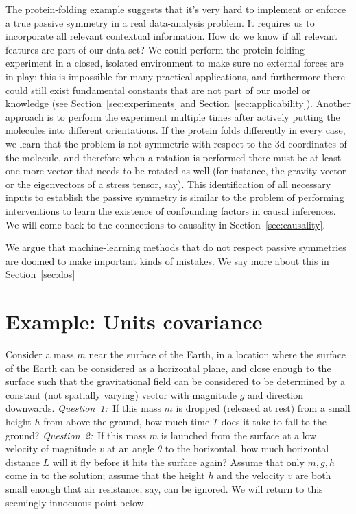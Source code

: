 \documentclass{article}
\theoremstyle{plain}
\theoremstyle{definition}
\theoremstyle{remark}
\newcommand{\sectionname}{Section}
\newcommand{\secref}[1]{\sectionname~\ref{#1}}
\begin{document}
The protein-folding example suggests that it's very hard to implement or enforce a true passive symmetry in a real data-analysis problem.
It requires us to incorporate all relevant contextual information.
How do we know if all relevant features are part of our data set?
We could perform the protein-folding experiment in a closed, isolated environment to make sure no external forces are in play;
this is impossible for many practical applications, and furthermore there could still exist fundamental constants that are not part of our model or knowledge (see \secref{sec:experiments} and \secref{sec:applicability}).
Another approach is to perform the experiment multiple times after actively putting the molecules into different orientations.
If the protein folds differently in every case, we learn that the problem is not symmetric with respect to the 3d coordinates of the molecule, and therefore when a rotation is performed there must be at least one more vector that needs to be rotated as well (for instance, the gravity vector or the eigenvectors of a stress tensor, say).
This identification of all necessary inputs to establish the passive symmetry is similar to the problem of performing interventions to learn the existence of confounding factors in causal inferences.
We will come back to the connections to causality in \secref{sec:causality}.

We argue that machine-learning methods that do not respect passive symmetries are doomed to make important kinds of mistakes.
We say more about this in \secref{sec:dos}

\section{Example: Units covariance}\label{sec:units}

Consider a mass $m$ near the surface of the Earth, in a location where the surface of the Earth can be considered as a horizontal plane, and close enough to the surface such that the gravitational field can be considered to be determined by a constant (not spatially varying) vector with magnitude $g$ and direction downwards.
\textsl{Question~1:}~If this mass $m$ is dropped (released at rest) from a small height $h$ from above the ground, how much time $T$ does it take to fall to the ground?
\textsl{Question~2:}~If this mass $m$ is launched from the surface at a low velocity of magnitude $v$ at an angle $\theta$ to the horizontal, how much horizontal distance $L$ will it fly before it hits the surface again?
Assume that only $m, g, h$ come in to the solution; assume that the height $h$ and the velocity $v$ are both small enough that air resistance, say, can be ignored.
We will return to this seemingly innocuous point below.
\end{document}
